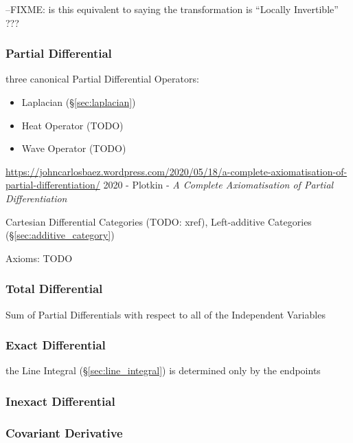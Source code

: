 {--FIXME: is this equivalent to saying the transformation is ``Locally
Invertible'' ???



\subsubsection{Partial Differential}\label{sec:partial_differential}

three canonical Partial Differential Operators:
\begin{itemize}
  \item Laplacian (\S\ref{sec:laplacian})
  \item Heat Operator (TODO)
  \item Wave Operator (TODO)
\end{itemize}

\url{https://johncarlosbaez.wordpress.com/2020/05/18/a-complete-axiomatisation-of-partial-differentiation/}
2020 - Plotkin - \emph{A Complete Axiomatisation of Partial Differentiation}

Cartesian Differential Categories (TODO: xref), Left-additive Categories
(\S\ref{sec:additive_category})

Axioms: TODO



\subsubsection{Total Differential}\label{sec:total_differential}

Sum of Partial Differentials with respect to all of the Independent
Variables



\subsubsection{Exact Differential}\label{sec:exact_differential}

the Line Integral (\S\ref{sec:line_integral}) is determined only by the
endpoints



\subsubsection{Inexact Differential}\label{sec:inexact_differential}

\subsubsection{Covariant Derivative}\label{sec:covariant_derivative}

}

